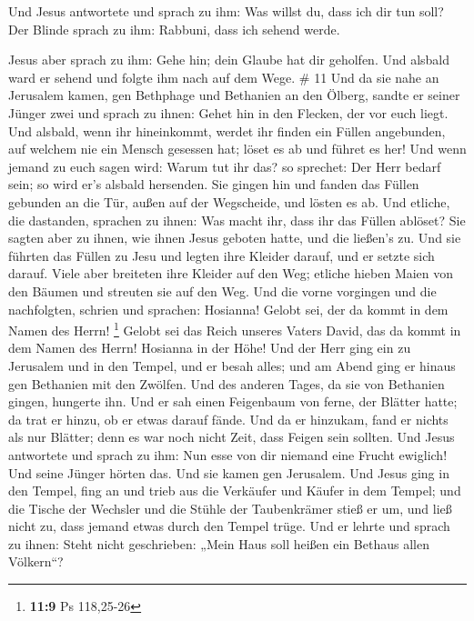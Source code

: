  Und Jesus antwortete und sprach zu ihm: Was willst du,
dass ich dir tun soll? Der Blinde sprach zu ihm: Rabbuni, dass ich
sehend werde.

 Jesus aber sprach zu ihm: Gehe hin; dein Glaube hat dir
geholfen. Und alsbald ward er sehend und folgte ihm nach auf dem Wege.
\# 11  Und da sie nahe an Jerusalem kamen, gen Bethphage und
Bethanien an den Ölberg, sandte er seiner Jünger zwei  und
sprach zu ihnen: Gehet hin in den Flecken, der vor euch liegt. Und
alsbald, wenn ihr hineinkommt, werdet ihr finden ein Füllen angebunden,
auf welchem nie ein Mensch gesessen hat; löset es ab und führet es her!
 Und wenn jemand zu euch sagen wird: Warum tut ihr das? so
sprechet: Der Herr bedarf sein; so wird er's alsbald hersenden.
 Sie gingen hin und fanden das Füllen gebunden an die Tür,
außen auf der Wegscheide, und lösten es ab.  Und etliche,
die dastanden, sprachen zu ihnen: Was macht ihr, dass ihr das Füllen
ablöset?  Sie sagten aber zu ihnen, wie ihnen Jesus geboten
hatte, und die ließen's zu.  Und sie führten das Füllen zu
Jesu und legten ihre Kleider darauf, und er setzte sich darauf.
 Viele aber breiteten ihre Kleider auf den Weg; etliche
hieben Maien von den Bäumen und streuten sie auf den Weg. 
Und die vorne vorgingen und die nachfolgten, schrien und sprachen:
Hosianna! Gelobt sei, der da kommt in dem Namen des Herrn! \footnote{\textbf{11:9}
  Ps 118,25-26}  Gelobt sei das Reich unseres Vaters David,
das da kommt in dem Namen des Herrn! Hosianna in der Höhe! 
Und der Herr ging ein zu Jerusalem und in den Tempel, und er besah
alles; und am Abend ging er hinaus gen Bethanien mit den Zwölfen.
 Und des anderen Tages, da sie von Bethanien gingen,
hungerte ihn.  Und er sah einen Feigenbaum von ferne, der
Blätter hatte; da trat er hinzu, ob er etwas darauf fände. Und da er
hinzukam, fand er nichts als nur Blätter; denn es war noch nicht Zeit,
dass Feigen sein sollten.  Und Jesus antwortete und sprach
zu ihm: Nun esse von dir niemand eine Frucht ewiglich! Und seine Jünger
hörten das.  Und sie kamen gen Jerusalem. Und Jesus ging in
den Tempel, fing an und trieb aus die Verkäufer und Käufer in dem
Tempel; und die Tische der Wechsler und die Stühle der Taubenkrämer
stieß er um,  und ließ nicht zu, dass jemand etwas durch
den Tempel trüge.  Und er lehrte und sprach zu ihnen: Steht
nicht geschrieben: „Mein Haus soll heißen ein Bethaus allen Völkern``?
